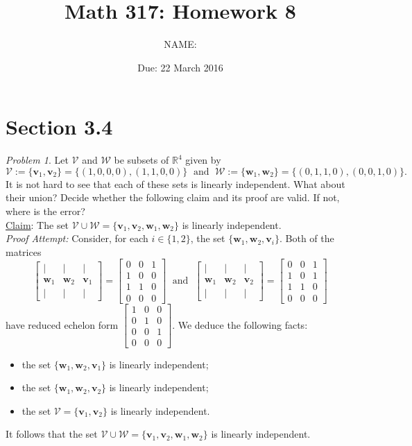 \documentclass[fleqn,11pt]{paper}
\author         {NAME:                     }
\title{Math 317: Homework 8}
\date{Due: 22 March 2016}
\theoremstyle{remark}
\newtheorem{problem}{Problem}
\newcommand\R{\fld{R}}
\renewcommand{\vec}[1]{\mathbf{#1}}
\newcommand{\<}{\ensuremath{\langle}}
\renewcommand{\>}{\ensuremath{\rangle}}
\newcommand\fld[1]{\ensuremath{\mathbb{#1}}}
\newcommand\vv{\vec{v}}
\newcommand\vw{\vec{w}}
\newcommand\sV{\ensuremath{\mathcal V}}
\newcommand\sW{\ensuremath{\mathcal W}}
\begin{document}
\maketitle
\section*{Section 3.4}
\begin{problem}
Let $\sV$ and $\sW$ be subsets of $\R^4$ given by
\[
\sV :=\{\vv_1, \vv_2\} = \{(1,0,0,0), (1,1,0,0)\} \; \text{ and } \;
\sW := \{\vw_1, \vw_2\} =\{(0,1,1,0), (0,0,1,0)\}.
\]
It is not hard to see that each of these sets is linearly independent.  What about their union?
Decide whether the following claim and its proof are valid.  If not, where is the error?
\\[5pt]
\underline{Claim}: The set $\sV \cup \sW = \{\vv_1, \vv_2, \vw_1, \vw_2\}$ is linearly independent. \\[4pt]
{\it Proof Attempt:} Consider, for each $i\in \{1, 2\}$, the set $\{\vw_1, \vw_2, \vv_i\}$.
Both of the matrices
\[
\begin{bmatrix*}
    | & | & |\\
    \vw_1& \vw_2 & \vv_1\\
    | & | & |
  \end{bmatrix*}=
  \begin{bmatrix*}
    0  & 0 & 1\\
    1  & 0 & 0\\
    1  & 1 & 0\\
    0  & 0 & 0
  \end{bmatrix*}
\; \text{ and } \;
\begin{bmatrix*}
    | & | & |\\
    \vw_1& \vw_2 & \vv_2\\
    | & | & |
  \end{bmatrix*}=
  \begin{bmatrix*}
    0  & 0 & 1\\
    1  & 0 & 1\\
    1  & 1 & 0\\
    0  & 0 & 0
  \end{bmatrix*}\]
  have reduced echelon form
  $\begin{bmatrix*}
    1  & 0 & 0\\
    0  & 1 & 0\\
    0  & 0 & 1\\
    0  & 0 & 0
  \end{bmatrix*}$.
We deduce the following facts:
\begin{itemize}
\item the set $\{\vw_1, \vw_2, \vv_1\}$ is linearly independent;
\item the set $\{\vw_1, \vw_2, \vv_2\}$ is linearly independent;
\item the set $\sV = \{\vv_1, \vv_2\}$ is linearly independent.
\end{itemize}
It follows that the set $\sV \cup \sW = \{\vv_1, \vv_2, \vw_1, \vw_2\}$ is linearly independent. 
\end{problem}
\end{document}
